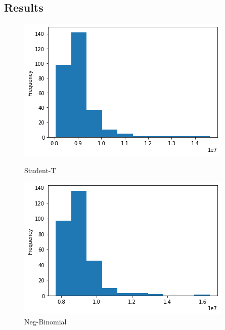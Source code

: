 \subsection{Results}
\begin{figure}[htb]
    \centering
      \includegraphics[width=\linewidth]{3_approach/figures/histogram_deepar_electricity_statistics_300_samples.png}
      \caption{Student-T}
      \label{fig:deepar_student_t_distibution}
    \endminipage\hfill
      \includegraphics[width=\linewidth]{3_approach/figures/histogram_deepar_negbin_electricity_statistics_200_samples.png}
      \caption{Neg-Binomial}
      \label{fig:deepar_negbinomial_distibution}
    \endminipage\hfill

\end{figure}
